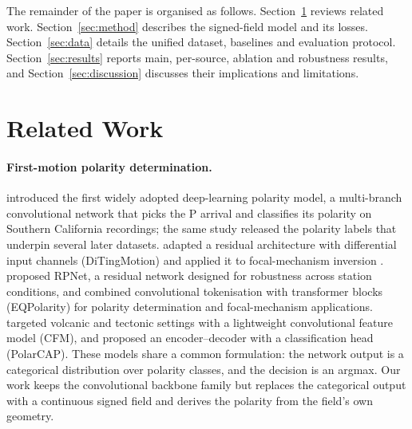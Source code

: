 \documentclass[11pt]{article}
\begin{document}
The remainder of the paper is organised as follows.
Section~\ref{sec:related} reviews related work.
Section~\ref{sec:method} describes the signed-field model and its losses.
Section~\ref{sec:data} details the unified dataset, baselines and evaluation
protocol. Section~\ref{sec:results} reports main, per-source, ablation and
robustness results, and Section~\ref{sec:discussion} discusses their
implications and limitations.

\section{Related Work}
\label{sec:related}

\paragraph{First-motion polarity determination.}
\citet{ross2018} introduced the first widely adopted deep-learning polarity
model, a multi-branch convolutional network that picks the P arrival and
classifies its polarity on Southern California recordings; the same study
released the polarity labels that underpin several later datasets.
\citet{zhao2023ditingmotion} adapted a residual architecture with differential
input channels (DiTingMotion) and applied it to focal-mechanism inversion
\citep{zhao2023diting}. \citet{han2025rpnet} proposed RPNet, a residual network
designed for robustness across station conditions, and \citet{chen2024eqpolarity}
combined convolutional tokenisation with transformer blocks (EQPolarity) for
polarity determination and focal-mechanism applications. \citet{messuti2023cfm}
targeted volcanic and tectonic settings with a lightweight convolutional
feature model (CFM), and \citet{chakraborty2022polarcap} proposed an
encoder--decoder with a classification head (PolarCAP). These models share a
common formulation: the network output is a categorical distribution over
polarity classes, and the decision is an argmax. Our work keeps the
convolutional backbone family but replaces the categorical output with a
continuous signed field and derives the polarity from the field's own geometry.
\end{document}
